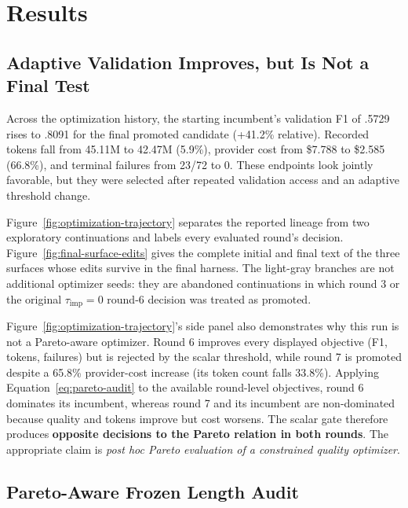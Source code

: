 \section{Results}
\label{sec:results}
\suppressfloats[t]

\subsection{Adaptive Validation Improves, but Is Not a Final Test}

Across the optimization history, the starting incumbent's validation F1 of
.5729 rises to .8091 for the final promoted candidate (+41.2\% relative).
Recorded tokens fall from 45.11M to 42.47M (5.9\%), provider cost from
\$7.788 to \$2.585 (66.8\%), and terminal failures from 23/72 to 0. These
endpoints look jointly favorable, but they were selected after repeated
validation access and an adaptive threshold change.

Figure~\ref{fig:optimization-trajectory} separates the reported lineage from
two exploratory continuations and labels every evaluated round's decision.
Figure~\ref{fig:final-surface-edits} gives the complete initial and final text
of the three surfaces whose edits survive in the final harness. The light-gray
branches are not additional optimizer seeds: they are abandoned continuations
in which round 3 or the original $\tau_{\mathrm{imp}}=0$ round-6 decision was
treated as promoted.



Figure~\ref{fig:optimization-trajectory}'s side panel also demonstrates why
this run is not a Pareto-aware optimizer. Round 6 improves every displayed
objective (F1, tokens, failures) but is rejected by the scalar threshold,
while round 7 is promoted despite a 65.8\% provider-cost increase (its token
count falls 33.8\%). Applying Equation~\ref{eq:pareto-audit} to the available
round-level objectives, round 6 dominates its incumbent, whereas round 7 and its incumbent are
non-dominated because quality and tokens improve but cost worsens. The scalar
gate therefore produces \textbf{opposite decisions to the Pareto relation in
both rounds}. The appropriate claim is \emph{post hoc Pareto evaluation of a
constrained quality optimizer}.

\subsection{Pareto-Aware Frozen Length Audit}

